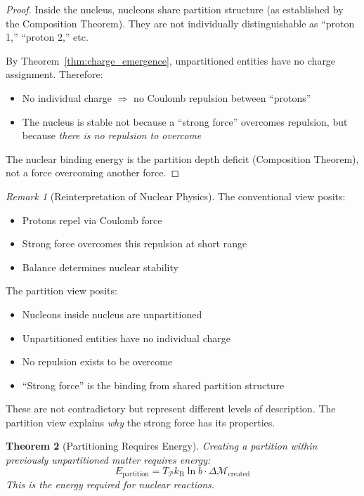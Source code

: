 \documentclass[twocolumn,10pt,a4paper]{article}
\newtheorem{theorem}{Theorem}[section]
\theoremstyle{definition}
\theoremstyle{remark}
\newtheorem{remark}[theorem]{Remark}
\newcommand{\kB}{k_{\mathrm{B}}}
\newcommand{\Partition}{\mathcal{P}}
\newcommand{\Depth}{\mathcal{M}}
\begin{document}
\begin{proof}
Inside the nucleus, nucleons share partition structure (as established by the Composition Theorem). They are not individually distinguishable as ``proton 1,'' ``proton 2,'' etc.

By Theorem~\ref{thm:charge_emergence}, unpartitioned entities have no charge assignment. Therefore:
\begin{itemize}
    \item No individual charge $\Rightarrow$ no Coulomb repulsion between ``protons''
    \item The nucleus is stable not because a ``strong force'' overcomes repulsion, but because \emph{there is no repulsion to overcome}
\end{itemize}

The nuclear binding energy is the partition depth deficit (Composition Theorem), not a force overcoming another force.
\end{proof}

\begin{remark}[Reinterpretation of Nuclear Physics]
The conventional view posits:
\begin{itemize}
    \item Protons repel via Coulomb force
    \item Strong force overcomes this repulsion at short range
    \item Balance determines nuclear stability
\end{itemize}

The partition view posits:
\begin{itemize}
    \item Nucleons inside nucleus are unpartitioned
    \item Unpartitioned entities have no individual charge
    \item No repulsion exists to be overcome
    \item ``Strong force'' is the binding from shared partition structure
\end{itemize}

These are not contradictory but represent different levels of description. The partition view explains \emph{why} the strong force has its properties.
\end{remark}

\begin{theorem}[Partitioning Requires Energy]
\label{thm:partition_energy}
Creating a partition within previously unpartitioned matter requires energy:
\begin{equation}
    E_{\text{partition}} = T_{\Partition} \kB \ln b \cdot \Delta\Depth_{\text{created}}
\end{equation}
This is the energy required for nuclear reactions.
\end{theorem}
\end{document}
